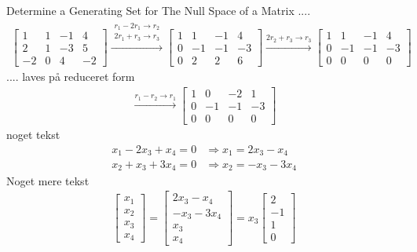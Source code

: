 \begin{example}{Determine a Generating Set for The Null Space of a Matrix }
....
\begin{align*}
\begin{bmatrix}
    1 & 1 & -1 & 4 \\
    2 & 1 & -3 & 5\\
    -2 & 0 & 4 & -2
\end{bmatrix}\xrightarrow{\substack{r_1-2r_1\rightarrow r_2\\2r_1+r_3\rightarrow r_3}}
\begin{bmatrix}
    1 & 1 & -1 & 4 \\
    0 & -1 & -1 & -3\\
    0 & 2 & 2 & 6
\end{bmatrix}\xrightarrow{2r_2+r_3\rightarrow r_3}
\begin{bmatrix}
   1 & 1 & -1 & 4 \\
    0 & -1 & -1 & -3\\
    0 & 0 & 0 & 0 
\end{bmatrix}
\end{align*}
.... laves på reduceret form
\begin{align*}
\xrightarrow{r_1-r_2\rightarrow r_1}
\begin{bmatrix}
   1 & 0 & -2 & 1 \\
    0 & -1 & -1 & -3\\
    0 & 0 & 0 & 0
\end{bmatrix}
\end{align*}
noget tekst
\begin{align*}
    x_1 - 2x_3 + x_4 = 0 &\Rightarrow x_1 = 2x_3 - x_4\\
    x_2 + x_3 + 3x_4 = 0 &\Rightarrow x_2=-x_3 -3x_4
\end{align*}
Noget mere tekst
\begin{align*}
\begin{bmatrix}
   x_1\\x_2\\x_3\\x_4 
\end{bmatrix} =
\begin{bmatrix}
   2x_3 - x_4 \\ -x_3 -3x_4 \\ x_3 \\ x_4
\end{bmatrix} = x_3
\begin{bmatrix}
   2\\ -1\\ 1 \\0

\end{bmatrix}
\end{align*}
\end{example}
